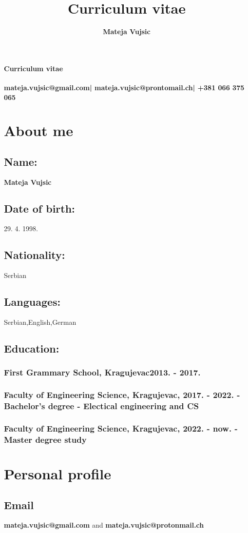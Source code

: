 \documentclass[10pt]{article}
\title{Curriculum vitae}
\author{\textbf{Mateja Vujsic}}
\makeatletter
\renewcommand{\maketitle}{
	\begin{center}
	{\Large\textbf{Curriculum vitae}}\\
	\vspace{.62em}
	{\huge\bfseries\theauthor}\\
	\vspace{.62em}
	{\bfseries{mateja.vujsic@gmail.com| mateja.vujsic@prontomail.ch| +381 066 375 065}}
	\end{center}
}
\makeatother
\begin{document}
\maketitle

\section{About me}
\subsection{\large{Name:}}
\textbf{\large{Mateja Vujsic}}
\subsection{\large{Date of birth:}}
\large{29. 4. 1998.}
\subsection{\large{Nationality:}}
\large{Serbian}
\subsection{\large{Languages:}}
\large{Serbian,English,German}
\subsection{\large{Education:}}
\subsubsection{First Grammary School, Kragujevac\hfill 2013. - 2017.}
\subsubsection{Faculty of Engineering Science, Kragujevac, 2017. -
2022. - Bachelor's degree - Electical engineering and CS}
\subsubsection{Faculty of Engineering Science, Kragujevac, 2022. -
now. - Master degree study}

\section{Personal profile}
\subsection{Email}
\textbf{mateja.vujsic@gmail.com} and \textbf{mateja.vujsic@protonmail.ch}
\end{document}
